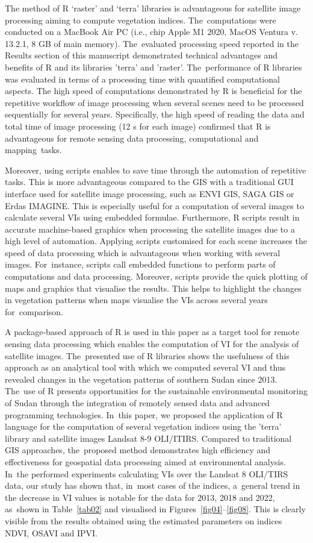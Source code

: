 \documentclass[jimaging,article,accept,pdftex,moreauthors]{Definitions/mdpi}
\begin{document}
The method of R `raster' and `terra' libraries is advantageous for satellite image processing aiming to compute vegetation indices. The~computations were conducted on a MacBook Air PC (i.e., chip Apple M1 2020, MacOS Ventura v. 13.2.1, 8 GB of main memory). The~evaluated processing speed reported in the Results section of this manuscript demonstrated technical advantages and benefits of R and its libraries 'terra' and 'raster'. The~performance of R libraries was evaluated in terms of a processing time with quantified computational aspects. The high speed of computations demonstrated by R is beneficial for the repetitive workflow of image processing when several scenes need to be processed sequentially for several years. Specifically, the high speed of reading the data and total time of image processing (12 s for each image) confirmed that R is advantageous for remote sensing data processing, computational and mapping~tasks.

Moreover, using scripts enables to save time through the automation of repetitive tasks. This is more advantageous compared to the GIS with  a traditional GUI interface used for satellite image processing, such as ENVI GIS, SAGA GIS or Erdas IMAGINE. This is especially useful for a computation of several images to calculate several VIs using embedded formulae. Furthermore, R scripts result in accurate machine-based graphics when processing the satellite images due to a high level of automation. Applying scripts customised for each scene increases the speed of data processing which is advantageous when working with several images. For~instance, scripts call embedded functions to perform parts of computations and data processing. Moreover, scripts provide the quick plotting of maps and graphics that visualise the results. This helps to highlight the changes in vegetation patterns when maps visualise the VIs across several years for~comparison. 


A package-based approach of R is used in this paper as a target tool for remote sensing data processing which enables the computation of VI for the analysis of satellite images. The~presented use of R libraries shows the usefulness of this approach as an analytical tool with which we computed several VI and thus revealed changes in the vegetation patterns of southern Sudan since 2013. The~use of R presents opportunities for the sustainable environmental monitoring of Sudan through the integration of remotely sensed data and advanced programming technologies. In~this paper, we proposed the application of R language for the computation of several vegetation indices using the 'terra' library and satellite images Landsat 8-9 OLI/ITIRS. Compared to traditional GIS approaches, the~proposed method demonstrates high efficiency and effectiveness for geospatial data processing aimed at environmental analysis. In~the performed experiments  calculating VIs over the Landsat 8 OLI/TIRS data, our study has shown that, in~most cases of the indices, a~general trend in the decrease in VI values is notable for the data for 2013, 2018 and 2022, as~shown in Table~\ref{tab02} and visualised in Figures~\ref{fig04}--\ref{fig08}. This is clearly visible from the results obtained using the estimated parameters on indices NDVI, OSAVI and IPVI. 
\end{document}
